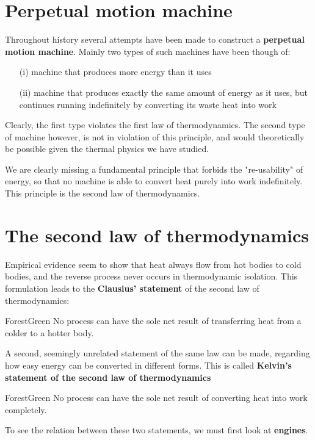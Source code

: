 \documentclass[a4paper,11pt,oneside]{book}
\begin{document}
\section{Perpetual motion machine}
Throughout history several attempts have been made to construct a \textbf{perpetual motion machine}. Mainly two types of such machines have been though of:
\begin{enumerate}
    \item[(i)] machine that produces more energy than it uses
    \item[(ii)] machine that produces exactly the same amount of energy as it uses, but continues running indefinitely by converting its waste heat into work
\end{enumerate}
Clearly, the first type violates the first law of thermodynamics. The second type of machine however, is not in violation of this principle, and would theoretically be possible given the thermal physics we have studied. 

We are clearly missing a fundamental principle that forbids the "re-usability" of energy, so that no machine is able to convert heat purely into work indefinitely. This principle is the second law of thermodynamics. 

\section{The second law of thermodynamics}
Empirical evidence seem to show that heat always flow from hot bodies to cold bodies, and the reverse process never occurs in thermodynamic isolation. This formulation leads to the \textbf{Clausius' statement} of the second law of thermodynamics:
\begin{mybox}{ForestGreen}{\textbf{}}
No process can have the sole net result of transferring heat from a colder to a hotter body. 
\end{mybox}
A second, seemingly unrelated statement of the same law can be made, regarding how easy energy can be converted in different forms. This is called \textbf{Kelvin's statement of the second law of thermodynamics}

\begin{mybox}{ForestGreen}{\textbf{}}
No process can have the sole net result of converting heat into work completely. 
\end{mybox}

To see the relation between these two statements, we must first look at \textbf{engines}.
\end{document}
